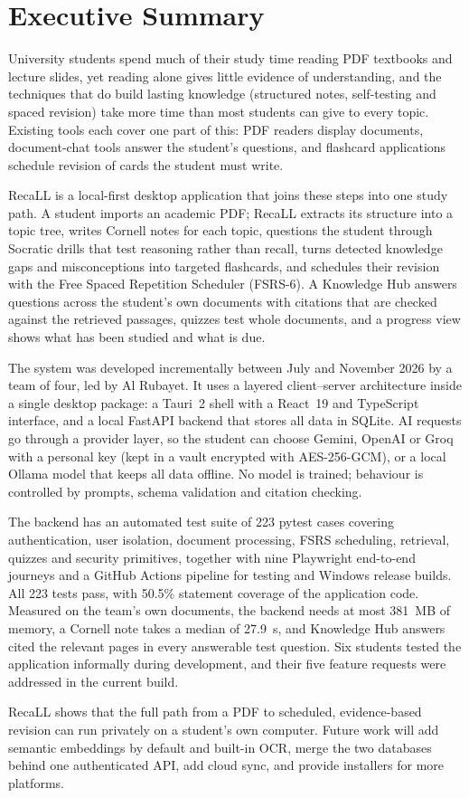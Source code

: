 \chapter*{Executive Summary}

University students spend much of their study time reading PDF textbooks and lecture slides, yet
reading alone gives little evidence of understanding, and the techniques that do build lasting
knowledge (structured notes, self-testing and spaced revision) take more time than most students can
give to every topic. Existing tools each cover one part of this: PDF readers display documents,
document-chat tools answer the student's questions, and flashcard applications schedule revision of
cards the student must write.

RecaLL is a local-first desktop application that joins these steps into one study path. A student
imports an academic PDF; RecaLL extracts its structure into a topic tree, writes Cornell notes for each
topic, questions the student through Socratic drills that test reasoning rather than recall, turns
detected knowledge gaps and misconceptions into targeted flashcards, and schedules their revision with
the Free Spaced Repetition Scheduler (FSRS-6). A Knowledge Hub answers questions across the student's
own documents with citations that are checked against the retrieved passages, quizzes test whole
documents, and a progress view shows what has been studied and what is due.

The system was developed incrementally between July and November 2026 by a team of four, led by Al
Rubayet. It uses a
layered client--server architecture inside a single desktop package: a Tauri~2 shell with a React~19 and
TypeScript interface, and a local FastAPI backend that stores all data in SQLite. AI requests go through
a provider layer, so the student can choose Gemini, OpenAI or Groq with a personal key (kept in a vault
encrypted with AES-256-GCM), or a local Ollama model that keeps all data offline. No model is trained;
behaviour is controlled by prompts, schema validation and citation checking.

The backend has an automated test suite of 223 pytest cases covering authentication, user isolation,
document processing, FSRS scheduling, retrieval, quizzes and security primitives, together with nine
Playwright end-to-end journeys and a GitHub Actions pipeline for testing and Windows release builds.
All 223 tests pass, with 50.5\% statement coverage of the application code. Measured on the team's own
documents, the backend needs at most 381~MB of memory, a Cornell note takes a median of 27.9~s, and
Knowledge Hub answers cited the relevant pages in every answerable test question.
Six students tested the application informally during development, and their five feature requests
were addressed in the current build.

RecaLL shows that the full path from a PDF to scheduled, evidence-based revision can run privately on a
student's own computer. Future work will add semantic embeddings by default and built-in OCR, merge
the two databases behind one authenticated API, add cloud sync, and provide installers for more
platforms.
